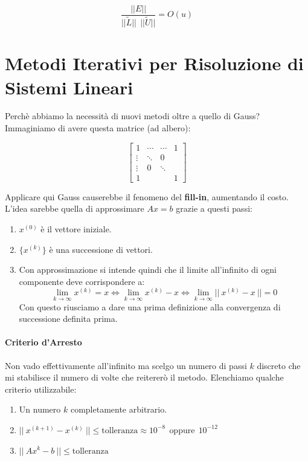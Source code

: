 \documentclass{article}
\begin{document}
\[ \frac{||E||}{||\tilde{L}||\:\: ||\tilde{U}||} = O(u) \]

\newpage

\section{Metodi Iterativi per Risoluzione di Sistemi Lineari}

Perchè abbiamo la necessità di nuovi metodi oltre a quello di Gauss? Immaginiamo di avere questa matrice (ad albero):

\[
\begin{bmatrix}
    1 & \cdots & \cdots & 1\\
    \vdots & \ddots   & 0 &  \\
    \vdots & 0 & \ddots &  \\
    1 & & & 1
\end{bmatrix}
\]

Applicare qui Gauss causerebbe il fenomeno del \textbf{fill-in}, aumentando il costo. L'idea sarebbe quella di approssimare $Ax = b$ grazie a questi passi:

\begin{enumerate}
    \item $x^{(0)}$ è il vettore iniziale.
    \item $\{ x^{(k)} \}$ è una successione di vettori.
    \item Con approssimazione si intende quindi che il limite all'infinito di ogni componente deve corrispondere a:
    \[ \lim_{k \rightarrow \infty} x^{(k)} = x \Leftrightarrow \lim_{k \rightarrow \infty} x^{(k)} - x \Leftrightarrow \lim_{k \rightarrow \infty} ||\:x^{(k)} - x \:|| = 0 \]
    Con questo riusciamo a dare una prima definizione alla convergenza di successione definita prima.
\end{enumerate}

\paragraph{Criterio d'Arresto} Non vado effettivamente all'infinito ma scelgo un numero di passi $k$ discreto che mi stabilisce il numero di volte che reitererò il metodo. Elenchiamo qualche criterio utilizzabile:

\begin{enumerate}
    \item Un numero $k$ completamente arbitrario.
    \item $||\: x^{(k+1)} - x^{(k)} \:|| \leq \text{tolleranza} \approx 10^{-8} \:\: \text{oppure} \:\: 10^{-12} $
    \item $||\: Ax^{k} - b \:|| \leq \text{tolleranza}$
\end{enumerate}
\end{document}

